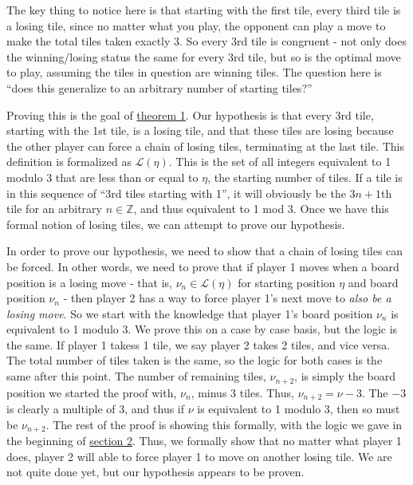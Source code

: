 \documentclass[11pt, letterpaper]{article}
\begin{document}
The key thing to notice here is that starting with the first tile, every third tile is a losing tile, since no matter what you play, the opponent can play a move to make the total tiles taken exactly 3. So every 3rd tile is congruent - not only does the winning/losing status the same for every 3rd tile, but so is the optimal move to play, assuming the tiles in question are winning tiles. The question here is ``does this generalize to an arbitrary number of starting tiles?''

Proving this is the goal of \hyperref[lma:1]{theorem 1}. Our hypothesis is that every 3rd tile, starting with the 1st tile, is a losing tile, and that these tiles are losing because the other player can force a chain of losing tiles, terminating at the last tile. This definition is formalized as $\mathcal{L} (\eta )$. This is the set of all integers equivalent to 1 modulo 3 that are less than or equal to $\eta $, the starting number of tiles. If a tile is in this sequence of ``3rd tiles starting with 1'', it will obviously be the $3n+1$th tile for an arbitrary $n\in\mathbb{Z}$, and thus equivalent to 1 mod $3$.  Once we have this formal notion of losing tiles, we can attempt to prove our hypothesis.

In order to prove our hypothesis, we need to show that a chain of losing tiles can be forced. In other words, we need to prove that if player 1 moves when a board position is a losing move - that is, $\nu_n \in \mathcal{L} (\eta )$ for starting position $\eta $ and board position $\nu_n $ - then player 2 has a way to force player 1's next move to \emph{also be a losing move}. So we start with the knowledge that player 1's board position $\nu _n$ is equivalent to 1 modulo 3. We prove this on a case by case basis, but the logic is the same. If player 1 takess 1 tile, we say player 2 takes 2 tiles, and vice versa. The total number of tiles taken is the same, so the logic for both cases is the same after this point. The number of remaining tiles, $\nu _{n+2}$, is simply the board position we started the proof with, $\nu _n$, minus 3 tiles. Thus, $\nu _{n+2}=\nu -3$. The $-3$ is clearly a multiple of 3, and thus if $\nu $ is equivalent to 1 modulo 3, then so must be $\nu _{n+2}$. The rest of the proof is showing this formally, with the logic we gave in the beginning of \hyperref[sec:2]{section 2}. Thus, we formally show that no matter what player 1 does, player 2 will able to force player 1 to move on another losing tile. We are not quite done yet, but our hypothesis appears to be proven.
\end{document}
